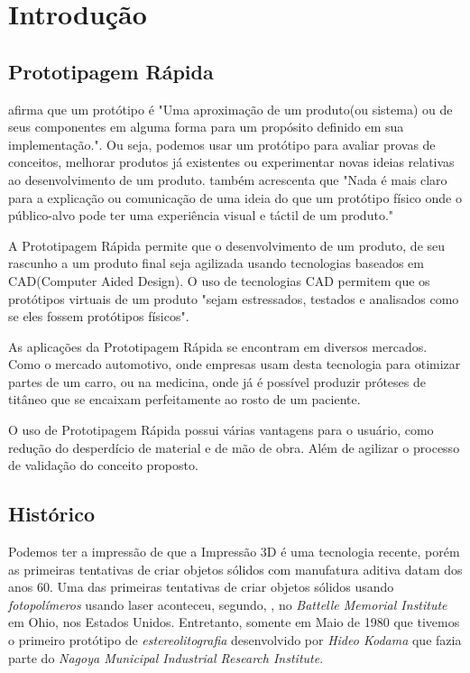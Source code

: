 \section{Introdução}

\newpage

\subsection{Prototipagem Rápida}
\citet{rapidproto2010} afirma que um protótipo é "Uma aproximação de um produto(ou sistema)
ou de seus componentes em alguma forma para um propósito definido em sua implementação.".
Ou seja, podemos usar um protótipo para avaliar provas de conceitos, melhorar produtos
já existentes ou experimentar novas ideias relativas ao desenvolvimento de um produto.
\citet{rapidproto2010} também acrescenta que "Nada é mais claro para a explicação ou comunicação
de uma ideia do que um protótipo físico onde o público-alvo pode ter uma experiência visual
e táctil de um produto."

A Prototipagem Rápida permite que o desenvolvimento de um produto, de seu rascunho
a um produto final seja agilizada usando tecnologias baseados em CAD(Computer Aided Design).
O uso de tecnologias CAD permitem que os protótipos virtuais de um produto
\citet{rapidproto2010} "sejam estressados, testados e analisados como se eles fossem protótipos físicos".

As aplicações da Prototipagem Rápida se encontram em diversos mercados. Como o mercado
automotivo, onde empresas usam desta tecnologia para otimizar partes de um carro, ou na medicina,
onde já é possível produzir próteses de titâneo que se encaixam perfeitamente ao rosto de um paciente.

O uso de Prototipagem Rápida possui várias vantagens para o usuário, como redução do desperdício
de material e de mão de obra. Além de agilizar o processo de validação do conceito proposto.

\subsection{Histórico}
Podemos ter a impressão de que a Impressão 3D é uma tecnologia recente, porém as primeiras
tentativas de criar objetos sólidos com manufatura aditiva datam dos anos 60.
Uma das primeiras tentativas de criar objetos sólidos usando \textit{fotopolímeros} usando laser
aconteceu, segundo, \citet{terry2016}, no \textit{Battelle Memorial Institute} em Ohio, nos Estados Unidos.
Entretanto, somente em Maio de 1980 que tivemos o primeiro protótipo de \textit{estereolitografia}
desenvolvido por \textit{Hideo Kodama} que fazia parte do \textit{Nagoya Municipal Industrial Research Institute}.


